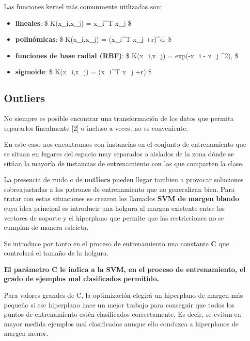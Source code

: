 \documentclass[11pt]{article}
\providecommand{\tightlist}{%
      \setlength{\itemsep}{0pt}\setlength{\parskip}{0pt}}
\begin{document}
Las funciones kernel más comunmente utilizadas son:

\begin{itemize}
\tightlist
\item
  \textbf{lineales}: \$ K(x\_i,x\_j) = x\_i\^{}T x\_j \$
\item
  \textbf{polinómicas}: \$ K(x\_i,x\_j) = (\gamma x\_i\^{}T x\_j
  +r)\^{}d, \gamma {} \$
\item
  \textbf{funciones de base radial (RBF)}: \$ K(x\_i,x\_j) =
  exp(-\gamma \lvert x\_i - x\_j \lvert \^{}2), \gamma {}\$
\item
  \textbf{sigmoide}: \$ K(x\_i,x\_j) = \tanh(\gamma x\_i\^{}T x\_j +r)
  \$
\end{itemize}

\subsection{Outliers}\label{outliers}

No siempre es posible encontrar una transformación de los datos que
permita separarlos linealmente {[}2{]} o incluso a veces, no es
conveniente.

En este caso nos encontramos con instancias en el conjunto de
entrenamiento que se situan en lugares del espacio muy separados o
aislados de la zona dónde se sitúan la mayoría de instancias de
entrenamiento con las que comparten la clase.

La presencia de ruido o de \textbf{outliers} pueden llegar tambien a
provocar soluciones sobreajustadas a los patrones de entrenamiento que
no generalizan bien. Para tratar con estas situaciones se crearon los
llamados \textbf{SVM de margen blando} cuya idea principal es introducir
una holgura al margen existente entre los vectores de soporte y el
hiperplano que permite que las restricciones no se cumplan de manera
estricta.

Se introduce por tanto en el proceso de entrenamiento una constante
\textbf{C} que controlará el tamaño de la holgura.

\textbf{El parámetro C le indica a la SVM, en el proceso de
entrenamiento, el grado de ejemplos mal clasificados permitido.}

Para valores grandes de C, la optimización elegirá un hiperplano de
margen más pequeño si ese hiperplano hace un mejor trabajo para
conseguir que todos los puntos de entrenamiento estén clasificados
correctamente. Es decir, se evitan en mayor medida ejemplos mal
clasificados aunque ello conduzca a hiperplanos de margen menor.
\end{document}
